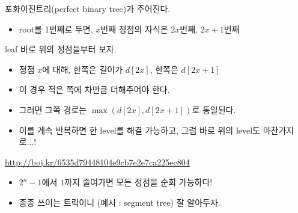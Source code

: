 \documentclass[hyperref={unicode}]{beamer}
\begin{document}
 
    \begin{frame}
         포화이진트리(perfect binary tree)가 주어진다.
        \begin{itemize}
            \item<2-> root를 1번째로 두면, $ x $번째 정점의 자식은 $ 2x $번째, $ 2x+1 $번째
        \end{itemize}
         leaf 바로 위의 정점들부터 보자.
        \begin{itemize}
            \item<4-> 정점 $ x $에 대해, 한쪽은 길이가 $ d[2x] $, 한쪽은 $ d[2x+1] $
            \item<5-> 이 경우 적은 쪽에 차만큼 더해주어야 한다.
            \item<6-> 그러면 그쪽 경로는 $ \max(d[2x], d[2x+1]) $로 통일된다.
            \item<7-> 이를 계속 반복하면 한 level를 해결 가능하고, 그럼 바로 위의 level도 마찬가지로...!
        \end{itemize}
        
    \end{frame}
    
    \begin{frame}
        \url{http://boj.kr/6535d79448104e9cb7e2e7ca225ec804}
                  
        \onslide  
        \begin{itemize}
            \item $ 2^n - 1 $에서 $ 1 $까지 줄여가면 모든 정점을 순회 가능하다!
            \item 종종 쓰이는 트릭이니 (예시 : segment tree) 잘 알아두자.
        \end{itemize}
    \end{frame}
\end{document}
